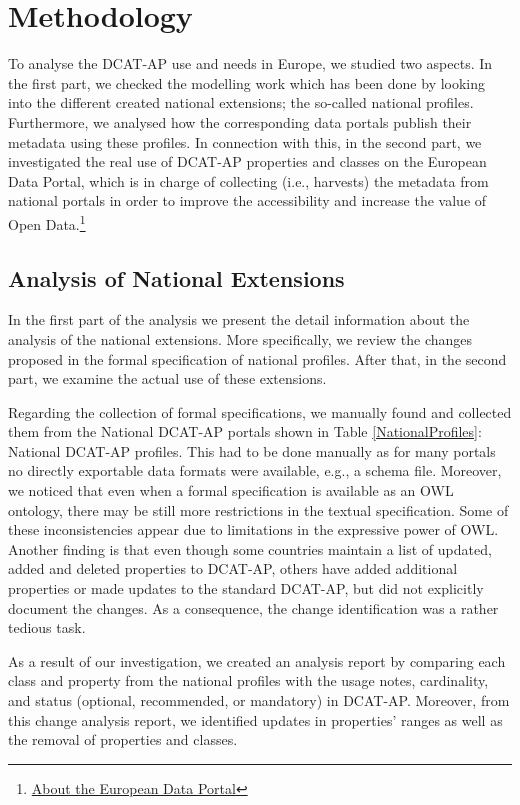 \documentclass[<options>]{elsarticle}
\begin{document}
\section{Methodology}
To analyse the DCAT-AP use and needs in Europe, we studied two aspects. In the first part, we checked the modelling work which has been done by looking into the different created national extensions; the so-called national profiles. Furthermore, we analysed how the corresponding data portals publish their metadata using these profiles. In connection with this, in the second part, we investigated the real use of DCAT-AP properties and classes on the European Data Portal, which is in charge of collecting (i.e., harvests) the metadata from national portals in order to improve the accessibility and increase the value of Open Data.\footnote{\href{https://www.europeandataportal.eu/en/what-we-do/our-activities}{About the European Data Portal}}

\subsection{Analysis of National Extensions}
In the first part of the analysis we present the detail information about the analysis of the national extensions. More specifically, we review the changes proposed in the formal specification of national profiles. After that, in the second part, we examine the actual use of these extensions.

Regarding the collection of formal specifications, we manually found and collected them from the National DCAT-AP portals shown in Table \ref{NationalProfiles}: National DCAT-AP profiles. This had to be done manually as for many portals no directly exportable data formats were available, e.g., a schema file. Moreover, we noticed that even when a formal specification is available as an OWL ontology, there may be still more restrictions in the textual specification. Some of these inconsistencies appear due to limitations in the expressive power of OWL.
Another finding is that even though some countries maintain a list of updated, added and deleted properties to DCAT-AP, others have added additional properties or made updates to the standard DCAT-AP, but did not explicitly document the changes. As a consequence, the change identification was a rather tedious task. 

As a result of our investigation, we created an analysis report by comparing each class and property from the national profiles with the usage notes, cardinality, and status (optional, recommended, or mandatory) in DCAT-AP. Moreover, from this change analysis report, we identified updates in properties’ ranges as well as the removal of properties and classes.
\end{document}
